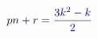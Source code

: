 \documentclass[12pt]{article}
\begin{document}
\makeatletter
\renewcommand*{\@textcolor}[3]{%
  \protect\leavevmode
  \begingroup
    \color#1{#2}#3%
  \endgroup
}
\makeatother
\begin{displaymath}
\mathcolor[RGB]{0,0,15}{p} \mathcolor[RGB]{0,0,30}{n} \mathcolor[RGB]{0,0,45}{+} \mathcolor[RGB]{0,0,60}{r} \mathcolor[RGB]{0,0,75}{=} \mathcolor[RGB]{0,0,90}{\frac { \mathcolor[RGB]{0,0,105}{3} \mathcolor[RGB]{0,0,120}{k} ^ { \mathcolor[RGB]{0,0,135}{2} } \mathcolor[RGB]{0,0,150}{-} \mathcolor[RGB]{0,0,165}{k} } { \mathcolor[RGB]{0,0,180}{2} } }
\end{displaymath}
\end{document}
